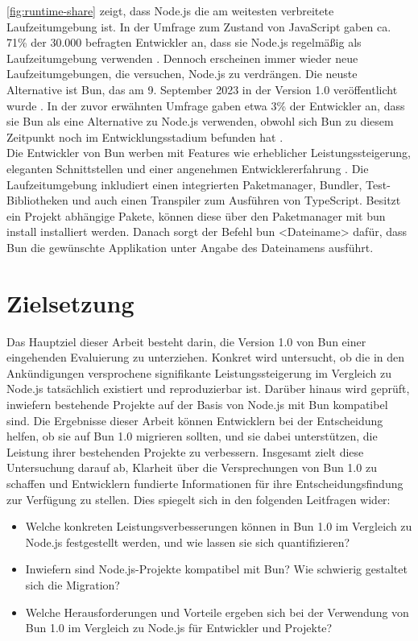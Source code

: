 \noindent
\autoref{fig:runtime-share} zeigt, dass Node.js die am weitesten verbreitete Laufzeitumgebung ist. In der Umfrage zum Zustand von JavaScript gaben ca. 71\% der 30.000 befragten Entwickler an, dass sie Node.js regelmäßig als Laufzeitumgebung verwenden \cite{Greif.2022}. Dennoch erscheinen immer wieder neue Laufzeitumgebungen, die versuchen, Node.js zu verdrängen. Die neuste Alternative ist Bun, das am 9. September 2023 in der Version 1.0 veröffentlicht wurde \cite{Sumner.2023c}. In der zuvor erwähnten Umfrage gaben etwa 3\% der Entwickler an, dass sie Bun als eine Alternative zu Node.js verwenden, obwohl sich Bun zu diesem Zeitpunkt noch im Entwicklungsstadium befunden hat \cite{Greif.2022}.\\

\noindent
Die Entwickler von Bun werben mit Features wie erheblicher Leistungssteigerung, eleganten Schnittstellen und einer angenehmen Entwicklererfahrung \cite{OvenSh.2023b}. Die Laufzeitumgebung inkludiert einen integrierten Paketmanager, Bundler, Test-Bibliotheken und auch einen Transpiler zum Ausführen von TypeScript. Besitzt ein Projekt abhängige Pakete, können diese über den Paketmanager mit \glqq bun install\grqq{} installiert werden. Danach sorgt der Befehl \glqq bun <Dateiname>\grqq{} dafür, dass Bun die gewünschte Applikation unter Angabe des Dateinamens ausführt.\cite{Sumner.2023c}

\section{Zielsetzung} \label{sec:introduction-target}
Das Hauptziel dieser Arbeit besteht darin, die Version 1.0 von Bun einer eingehenden Evaluierung zu unterziehen. Konkret wird untersucht, ob die in den Ankündigungen versprochene signifikante Leistungssteigerung im Vergleich zu Node.js tatsächlich existiert und reproduzierbar ist. Darüber hinaus wird geprüft, inwiefern bestehende Projekte auf der Basis von Node.js mit Bun kompatibel sind. Die Ergebnisse dieser Arbeit können Entwicklern bei der Entscheidung helfen, ob sie auf Bun 1.0 migrieren sollten, und sie dabei unterstützen, die Leistung ihrer bestehenden Projekte zu verbessern. Insgesamt zielt diese Untersuchung darauf ab, Klarheit über die Versprechungen von Bun 1.0 zu schaffen und Entwicklern fundierte Informationen für ihre Entscheidungsfindung zur Verfügung zu stellen. Dies spiegelt sich in den folgenden Leitfragen wider:
\begin{itemize}
    \item Welche konkreten Leistungsverbesserungen können in Bun 1.0 im Vergleich zu Node.js festgestellt werden, und wie lassen sie sich quantifizieren?
    \item Inwiefern sind Node.js-Projekte kompatibel mit Bun? Wie schwierig gestaltet sich die Migration?
    \item Welche Herausforderungen und Vorteile ergeben sich bei der Verwendung von Bun 1.0 im Vergleich zu Node.js für Entwickler und Projekte?
\end{itemize}

